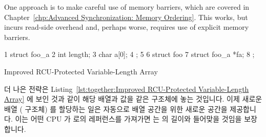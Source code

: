 One approach is to make careful use of memory barriers, which are
covered in Chapter~\ref{chp:Advanced Synchronization: Memory Ordering}.
This works, but incurs read-side overhead and, perhaps worse, requires
use of explicit memory barriers.
\fi

\begin{listing}[tbp]
{ \scriptsize
\begin{verbbox}
 1 struct foo_a {
 2   int length;
 3   char a[0];
 4 };
 5 
 6 struct foo {
 7   struct foo_a *fa;
 8 };
\end{verbbox}
}
\centering
\theverbbox
\caption{Improved RCU-Protected Variable-Length Array}
\label{lst:together:Improved RCU-Protected Variable-Length Array}
\end{listing}

더 나은 전략은
Listing~\ref{lst:together:Improved RCU-Protected Variable-Length Array}
에 보인 것과 같이 해당 배열과 값을 같은 구조체에 놓는 것입니다.
이제 새로운 배열 ( 구조체) 를 할당하는 일은 자동으로 배열 공간을 위한
새로운 공간을 제공합니다.
이는 어떤 CPU 가  로의 레퍼런스를 가져가면  는 
의 길이와 들어맞을 것임을 보장합니다.
\iffalse

A better approach is to put the value and the array into the same structure,
as shown in
Listing~\ref{lst:together:Improved RCU-Protected Variable-Length Array}.
Allocating a new array (\co{foo_a} structure) then automatically provides
a new place for the array length.
This means that if any CPU picks up a reference to \co{->fa}, it is
guaranteed that the \co{->length} will match the \co{->a[]}
length~\cite{Arcangeli03}.
\fi


